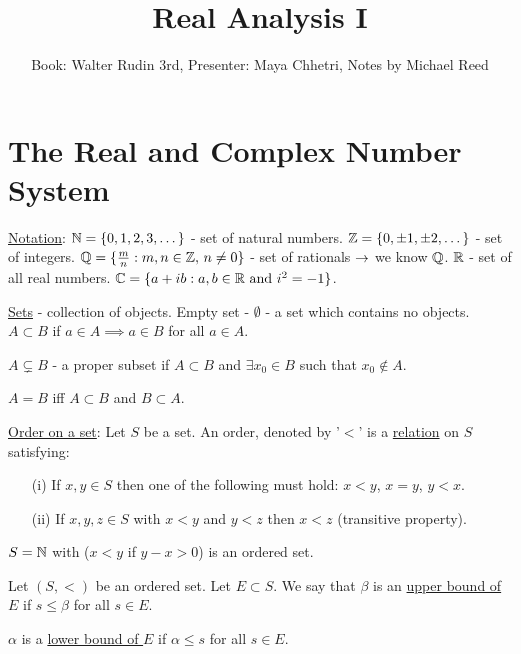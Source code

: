 \documentclass[]{article}
\author{Book: Walter Rudin 3rd, Presenter: Maya Chhetri, Notes by Michael Reed}
\title{Real Analysis I}
\begin{document}
\maketitle


\section{The Real and Complex Number System}

\ul{Notation}: $\mathbb{N} = \{0,1,2,3,\dots\}$ - set of natural numbers.
$\mathbb{Z} = \{0,\pm 1, \pm 2,\dots\}$ - set of integers.
$\mathbb{Q} = \{\frac{m}{n}:m,n\in\mathbb{Z},\, n\neq 0\}$ - set of rationals $\rightarrow$ we know $\mathbb{Q}$.
$\mathbb{R}$ - set of all real numbers.
$\mathbb{C} = \{a+ib: a,b\in\mathbb{R} \text{ and } i^2 = -1\}$.

\ul{Sets} - collection of objects. Empty set - $\emptyset$ - a set which contains no objects.
$A\subset B$ if $a\in A \implies a\in B$ for all $a\in A$.
\begin{example}
	$A\varsubsetneq B$ - a proper subset if $A\subset B$ and $\exists x_0 \in B$ such that $x_0 \notin A$.
\end{example}
\begin{note}
	$A = B$ iff $A\subset B$ and $B\subset A$.
\end{note}

\ul{Order on a set}: Let $S$ be a set. An order, denoted by '$<$' is a \ul{relation} on $S$ satisfying:
\begin{enumerate}
	\item[(i)] If $x,y\in S$ then one of the following must hold:
	$x<y$, $x = y$, $y<x$.
	\item[(ii)] If $x,y,z\in S$ with $x<y$ and $y<z$ then $x<z$ (transitive property).
\end{enumerate}
\begin{example}
	$S = \mathbb{N}$ with \say{$<$} ($x<y$ if $y-x>0$) is an ordered set.
\end{example}
\begin{definition}
	 Let $(S,<)$ be an ordered set. Let $E\subset S$. We say that $\beta$ is an \ul{upper bound of $E$} if $s\leq\beta$ for all $s\in E$.
\end{definition}
\begin{definition}
	 $\alpha$ is a \ul{lower bound of $E$} if $\alpha \leq s$ for all $s\in E$.
\end{definition}
\end{document}
